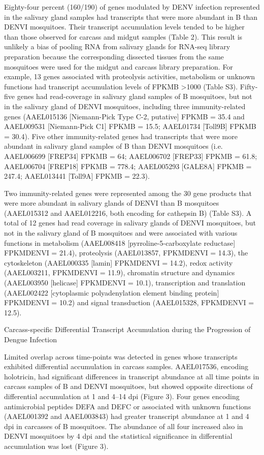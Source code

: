 Eighty-four percent (160/190) of genes modulated by DENV infection represented in the salivary gland samples had transcripts that were more abundant in B than DENVI mosquitoes.
Their transcript accumulation levels tended to be higher than those observed for carcass and midgut samples (Table 2).
This result is unlikely a bias of pooling RNA from salivary glands for RNA-seq library preparation because the corresponding dissected tissues from the same mosquitoes were used for the midgut and carcass library preparation.
For example, 13 genes associated with proteolysis activities, metabolism or unknown functions had transcript accumulation levels of FPKMB >1000 (Table S3).
Fifty-five genes had read-coverage in salivary gland samples of B mosquitoes, but not in the salivary gland of DENVI mosquitoes, including three immunity-related genes (AAEL015136 [Niemann-Pick Type C-2, putative] FPKMB = 35.4 and AAEL009531 [Niemann-Pick C1] FPKMB = 15.5; AAEL01734 [Toll9B] FPKMB = 30.4).
Five other immunity-related genes had transcripts that were more abundant in salivary gland samples of B than DENVI mosquitoes (i.e.
AAEL006699 [FREP34] FPKMB = 64; AAEL006702 [FREP33] FPKMB = 61.8; AAEL006704 [FREP18] FPKMB = 778.4; AAEL005293 [GALE8A] FPKMB = 247.4; AAEL013441 [Toll9A] FPKMB = 22.3).

Two immunity-related genes were represented among the 30 gene products that were more abundant in salivary glands of DENVI than B mosquitoes (AAEL015312 and AAEL012216, both encoding for cathepsin B) (Table S3).
A total of 12 genes had read coverage in salivary glands of DENVI mosquitoes, but not in the salivary gland of B mosquitoes and were associated with various functions in metabolism (AAEL008418 [pyrroline-5-carboxylate reductase] FPKMDENVI = 21.4), proteolysis (AAEL013857, FPKMDENVI = 14.3), the cytoskeleton (AAEL000335 [lamin] FPKMDENVI = 14.2), redox activity (AAEL003211, FPKMDENVI = 11.9), chromatin structure and dynamics (AAEL003950 [helicase] FPKMDENVI = 10.1), transcription and translation (AAEL002422 [cytoplasmic polyadenylation element binding protein] FPKMDENVI = 10.2) and signal transduction (AAEL015328, FPKMDENVI = 12.5).

Carcass-specific Differential Transcript Accumulation during the Progression of Dengue Infection

Limited overlap across time-points was detected in genes whose transcripts exhibited differential accumulation in carcass samples.
AAEL017536, encoding holotricin, had significant differences in transcript abundance at all time points in carcass samples of B and DENVI mosquitoes, but showed opposite directions of differential accumulation at 1 and 4–14 dpi (Figure 3).
Four genes encoding antimicrobial peptides DEFA and DEFC or associated with unknown functions (AAEL001392 and AAEL003843) had greater transcript abundance at 1 and 4 dpi in carcasses of B mosquitoes.
The abundance of all four increased also in DENVI mosquitoes by 4 dpi and the statistical significance in differential accumulation was lost (Figure 3).

